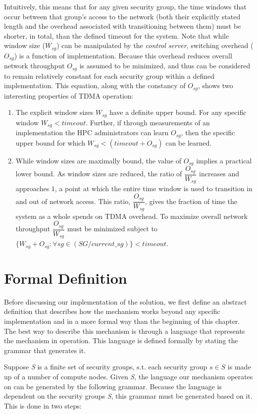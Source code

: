 \documentclass[oneside,12pt]{memoir}
\begin{document}
Intuitively, this means that for any given security group, the time windows that occur between that group's access to the network (both their explicitly stated length and the overhead associated with transitioning between them) must be shorter, in total, than the defined timeout for the system. Note that while window size ($W_{sg}$) can be manipulated by the \textit{control server}, switching overhead ($O_{sg}$) is a function of implementation. Because this overhead reduces overall network throughput $O_{sg}$ is assumed to be minimized, and thus can be considered to remain relatively constant for each security group within a defined implementation. This equation, along with the constancy of $O_{sg}$, shows two interesting properties of TDMA operation:
\begin{enumerate}
\item The explicit window sizes $W_{sg}$ have a definite upper bound. For any specific window $W_{sg} < timeout$. Further, if through measurements of an implementation the HPC administrators can learn $O_{sg}$, then the specific upper bound for which $W_{sg} < (timeout + O_{sg})$ can be learned.
\item While window sizes are maximally bound, the value of $O_{sg}$ implies a practical lower bound. As window sizes are reduced, the ratio of $\dfrac{O_{sg}}{W_{sg}}$ increases and approaches $1$, a point at which the entire time window is used to transition in and out of network access. This ratio, $\dfrac{O_{sg}}{W_{sg}}$, gives the fraction of time the system as a whole spends on TDMA overhead. To maximize overall network throughput $\dfrac{O_{sg}}{W_{sg}}$ must be minimized subject to $\{W_{sg} + O_{sg}: \forall sg\in (SG / current\_sg)\} < timeout$.
\end{enumerate}


\section{Formal Definition}
\label{sec:formal_definition}
Before discussing our implementation of the solution, we first define an abstract definition that describes how the mechanism works beyond any specific implementation and in a more formal way than the beginning of this chapter. The best way to describe this mechanism is through a language that represents the mechanism in operation. This language is defined formally by stating the grammar that generates it.

Suppose \emph{S} is a finite set of security groups, s.t. each security group $s\in S$ is made up of a number of compute nodes. Given \emph{S}, the language our mechanism operates on can be generated by the following grammar. Because the language is dependent on the security groups \emph{S}, this grammar must be generated based on it. This is done in two steps:
\end{document}
